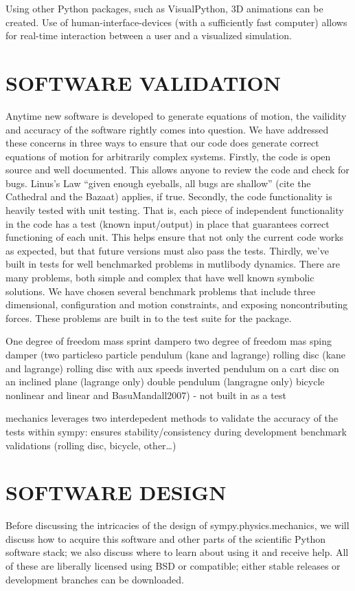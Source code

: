 \documentclass[twocolumn,10pt]{asme2e}
\begin{document}
Using other Python packages, such as VisualPython, 3D animations can be
created.
Use of human-interface-devices (with a sufficiently fast computer) allows for
real-time interaction between a user and a visualized simulation.

\section*{SOFTWARE VALIDATION}
Anytime new software is developed to generate equations of motion, the
vailidity and accuracy of the software rightly comes into question. We have
addressed these concerns in three ways to ensure that our code does generate
correct equations of motion for arbitrarily complex systems. Firstly, the code
is open source and well documented. This allows anyone to review the code and
check for bugs. Linus's Law ``given enough eyeballs, all bugs
are shallow'' (cite the Cathedral and the Bazaat) applies, if true.
Secondly, the code functionality is heavily tested with unit testing.  That is,
each piece of independent functionality in the code has a test (known
input/output) in place that guarantees correct functioning of each unit. This
helps ensure that not only the current code works as expected, but that future
versions must also pass the tests. Thirdly, we've built in tests for well
benchmarked problems in mutlibody dynamics. There are many problems, both
simple and complex that have well known symbolic solutions. We have chosen
several benchmark problems that include three dimensional, configuration and
motion constraints, and exposing noncontributing forces. These problems are
built in to the test suite for the package.

One degree of freedom mass sprint dampero
two degree of freedom mas sping damper (two particleso
particle pendulum (kane and lagrange)
rolling disc (kane and lagrange)
rolling disc with aux speeds
inverted pendulum on a cart
disc on an inclined plane (lagrange only)
double pendulum (langragne only)
bicycle nonlinear and linear \cite{Meijaard2007} and BasuMandall2007) - not built in as a test

mechanics leverages two interdepedent methods to validate the accuracy of the
tests within sympy: ensures stability/consistency during development
benchmark validations (rolling disc, bicycle, other\ldots)

\section*{SOFTWARE DESIGN}
Before discussing the intricacies of the design of sympy.physics.mechanics, we
will discuss how to acquire this software and other parts of the scientific
Python software stack; we also discuss where to learn about using it and
receive help.
All of these are liberally licensed using BSD or compatible; either stable
releases or development branches can be downloaded.
\end{document}
